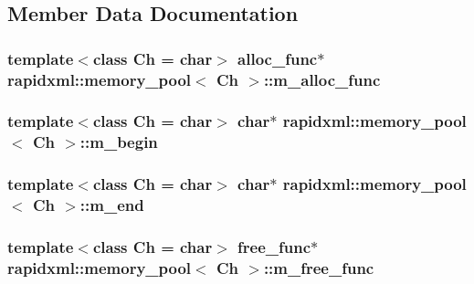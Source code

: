 \subsection{Member Data Documentation}
\hypertarget{classrapidxml_1_1memory__pool_ae8964773675d24f77a808356be773c1d}{
\subsubsection[{m\+\_\+alloc\+\_\+func}]{\setlength{\rightskip}{0pt plus 5cm}template$<$class Ch  = char$>$ alloc\+\_\+func$\ast$ {\bf rapidxml\+::memory\+\_\+pool}$<$ Ch $>$\+::m\+\_\+alloc\+\_\+func\hspace{0.3cm}{\ttfamily [private]}}}\label{classrapidxml_1_1memory__pool_ae8964773675d24f77a808356be773c1d}
\hypertarget{classrapidxml_1_1memory__pool_a775205c5faa60b63385c24368d26d4e1}{
\subsubsection[{m\+\_\+begin}]{\setlength{\rightskip}{0pt plus 5cm}template$<$class Ch  = char$>$ char$\ast$ {\bf rapidxml\+::memory\+\_\+pool}$<$ Ch $>$\+::m\+\_\+begin\hspace{0.3cm}{\ttfamily [private]}}}\label{classrapidxml_1_1memory__pool_a775205c5faa60b63385c24368d26d4e1}
\hypertarget{classrapidxml_1_1memory__pool_a6c9a83514446842518c9ffb7a38b76eb}{
\subsubsection[{m\+\_\+end}]{\setlength{\rightskip}{0pt plus 5cm}template$<$class Ch  = char$>$ char$\ast$ {\bf rapidxml\+::memory\+\_\+pool}$<$ Ch $>$\+::m\+\_\+end\hspace{0.3cm}{\ttfamily [private]}}}\label{classrapidxml_1_1memory__pool_a6c9a83514446842518c9ffb7a38b76eb}
\hypertarget{classrapidxml_1_1memory__pool_af8f41565f4de167eb2f40ca20695f24d}{
\subsubsection[{m\+\_\+free\+\_\+func}]{\setlength{\rightskip}{0pt plus 5cm}template$<$class Ch  = char$>$ free\+\_\+func$\ast$ {\bf rapidxml\+::memory\+\_\+pool}$<$ Ch $>$\+::m\+\_\+free\+\_\+func\hspace{0.3cm}{\ttfamily [private]}}}\label{classrapidxml_1_1memory__pool_af8f41565f4de167eb2f40ca20695f24d}
